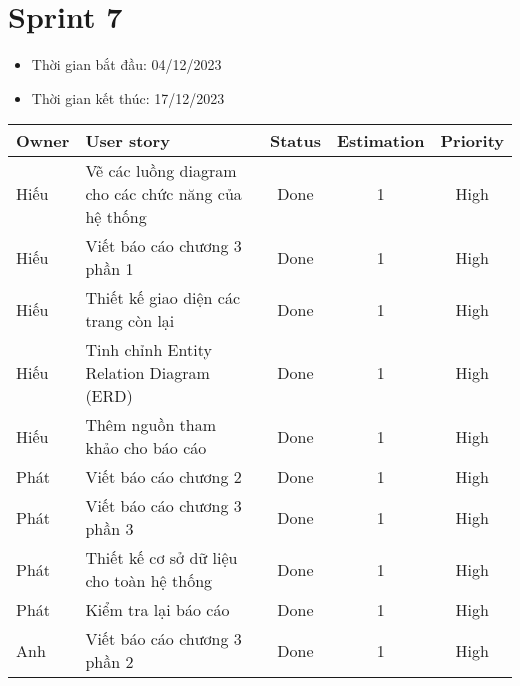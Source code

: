 \section{Sprint 7}
\begin{itemize}
    \item Thời gian bắt đầu: 04/12/2023
    \item Thời gian kết thúc: 17/12/2023
\end{itemize}
\begin{table}[H]
    \begin{tabular}{|m{2.5cm}|m{6cm}|c|c|c|}
    \hline
    \textbf{Owner}  & \textbf{User story}                                & \textbf{Status} & \textbf{Estimation} & \textbf{Priority} \\ \hline
    Hiếu               & Vẽ các luồng diagram cho các chức năng của hệ thống                     & Done            & 1                   & High         \\ \hline
    Hiếu              & Viết báo cáo chương 3 phần 1                     & Done            & 1                   & High         \\ \hline
    Hiếu                & Thiết kế giao diện các trang còn lại                    & Done            & 1                   & High         \\ \hline
    Hiếu               & Tinh chỉnh Entity Relation Diagram (ERD)                     & Done            & 1                   & High         \\ \hline
    Hiếu               & Thêm nguồn tham khảo cho báo cáo                     & Done            & 1                   & High         \\ \hline
    Phát                & Viết báo cáo chương 2                    & Done            & 1                   & High         \\ \hline
    Phát               & Viết báo cáo  chương 3 phần 3                    & Done            & 1                   & High         \\ \hline
    Phát               & Thiết kế cơ sở dữ liệu cho toàn hệ thống                     & Done            & 1                   & High         \\ \hline
    Phát                &Kiểm tra lại báo cáo                    & Done            & 1                   & High         \\ \hline
    Anh               & Viết báo cáo chương 3 phần 2                     & Done            & 1                   & High         \\ \hline

\end{tabular}
\end{table}
